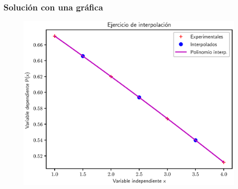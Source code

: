 \documentclass[12pt]{beamer}
\begin{document}
\begin{frame}
\frametitle{Solución con una gráfica}
\begin{figure}
    \centering
    \includegraphics[scale=0.58]{Imagenes/Ejercicio_Interpolacion_03.eps}
\end{figure}
\end{frame}
\end{document}
